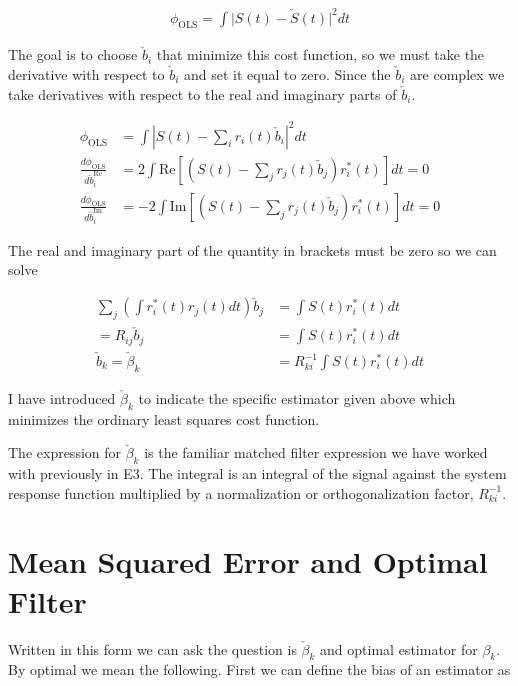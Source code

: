 \documentclass[12pt]{article}
\begin{document}
\begin{align}
\phi_{\text{OLS}} = \int \lvert S(t) - \check{S}(t) \rvert^2 dt
\end{align}

The goal is to choose $\check{b}_i$ that minimize this cost function, so we must take the derivative with respect to $\check{b}_i$ and set it equal to zero. Since the $\check{b}_i$ are complex we take derivatives with respect to the real and imaginary parts of $\check{b}_i$.

\begin{align}
\phi_{\text{OLS}} &= \int \left\lvert S(t) - \sum_i r_i(t) \check{b}_i \right \rvert^2 dt\\
\frac{d\phi_{\text{OLS}}}{d\check{b}_i^{\text{Re}}} &= 2\int \text{Re}\left[\left(S(t) - \sum_j r_j(t) \check{b}_j\right) r^*_i(t) \right]dt =  0\\
\frac{d\phi_{\text{OLS}}}{d\check{b}_i^{\text{Im}}} &= -2\int \text{Im}\left[\left(S(t) - \sum_j r_j(t) \check{b}_j\right) r^*_i(t) \right]dt =  0
\end{align}

The real and imaginary part of the quantity in brackets must be zero so we can solve

\begin{align}
\sum_j \left(\int r^*_i(t)r_j(t)dt \right) \check{b}_j &= \int S(t) r^*_i(t) dt\\
= R_{ij} \check{b}_j &= \int S(t) r^*_i(t) dt\\
\check{b}_k = \check{\beta}_k &= R_{ki}^{-1} \int S(t) r^*_i(t) dt
\end{align}

I have introduced $\check{\beta}_k$ to indicate the specific estimator given above which minimizes the ordinary least squares cost function.

The expression for $\check{\beta}_k$ is the familiar matched filter expression we have worked with previously in E3. The integral is an integral of the signal against the system response function multiplied by a normalization or orthogonalization factor, $R_{ki}^{-1}$.

\section{Mean Squared Error and Optimal Filter}

Written in this form we can ask the question is $\check{\beta}_k$ and optimal estimator for $\beta_k$. By optimal we mean the following. First we can define the bias of an estimator as
\end{document}
